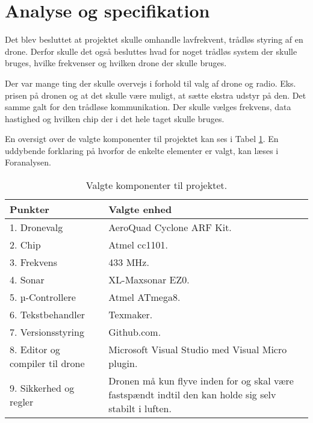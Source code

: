 \documentclass[Main]{subfiles}
\begin{document}
\section{Analyse og specifikation}
Det blev besluttet at projektet skulle omhandle lavfrekvent, trådløs styring af en drone. 
Derfor skulle det også besluttes hvad for noget trådløs system der skulle bruges, hvilke frekvenser og hvilken drone der skulle bruges.

Der var mange ting der skulle overvejs i forhold til valg af drone og radio.
Eks. prisen på dronen og at det skulle være muligt, at sætte ekstra udstyr på den.
Det samme galt for den trådløse kommunikation. 
Der skulle vælges frekvens, data hastighed og hvilken chip der i det hele taget skulle bruges.

En oversigt over de valgte komponenter til projektet kan ses i Tabel \ref{Tab:komponentliste}.
En uddybende forklaring på hvorfor de enkelte elementer er valgt, kan læses i 
Foranalysen\cite[s. 5 -- 13]{Foranalyse}.

\begin{table}[H]
	\begin{tabular}{p{} p{}}
	\hline
	Punkter & Valgte enhed \\ \hline
	1. Dronevalg & AeroQuad Cyclone ARF Kit. \\
	2. Chip & Atmel cc1101.\\
	3. Frekvens & 433 MHz.\\
	4. Sonar & XL-Maxsonar EZ0.\\
	5. µ-Controllere & Atmel ATmega8.\\
	6. Tekstbehandler & Texmaker.\\
	7. Versionsstyring & Github.com.\\
	8. Editor og compiler til drone & Microsoft Visual Studio med Visual Micro plugin.\\
	9. Sikkerhed og regler & Dronen må kun flyve inden for og skal være fastspændt indtil den kan holde sig selv stabilt i luften.\\ \hline
	\end{tabular}

\caption{Valgte komponenter til projektet.}
\label{Tab:komponentliste}
\end{table}
\end{document}
